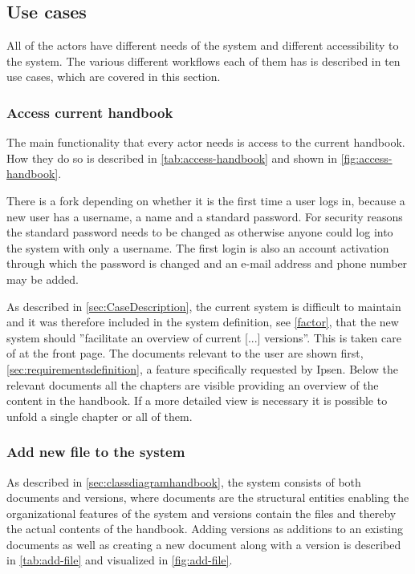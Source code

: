 \subsection{Use cases} \label{sec:usecases}
All of the actors have different needs of the system and different accessibility to the system.
The various different workflows each of them has is described in ten use cases, which are covered in this section.

\subsubsection{Access current handbook}
The main functionality that every actor needs is access to the current handbook.
How they do so is described in \cref{tab:access-handbook} and shown in \cref{fig:access-handbook}.




There is a fork depending on whether it is the first time a user logs in, because a new user has a username, a name and a standard password.
For security reasons the standard password needs to be changed as otherwise anyone could log into the system with only a username.
The first login is also an account activation through which the password is changed and an e-mail address and phone number may be added.

As described in \cref{sec:CaseDescription}, the current system is difficult to maintain and it was therefore included in the system definition, see \cref{factor}, that the new system should ''facilitate an overview of current [...] versions''.
This is taken care of at the front page.
The documents relevant to the user are shown first, \cref{sec:requirementsdefinition}, a feature specifically requested by Ipsen.
Below the relevant documents all the chapters are visible providing an overview of the content in the handbook.
If a more detailed view is necessary it is possible to unfold a single chapter or all of them.


\subsubsection{Add new file to the system}
As described in \cref{sec:classdiagramhandbook}, the system consists of both documents and versions, where documents are the structural entities enabling the organizational features of the system and versions contain the files and thereby the actual contents of the handbook.
Adding versions as additions to an existing documents as well as creating a new document along with a version is described in \cref{tab:add-file} and visualized in \cref{fig:add-file}.

